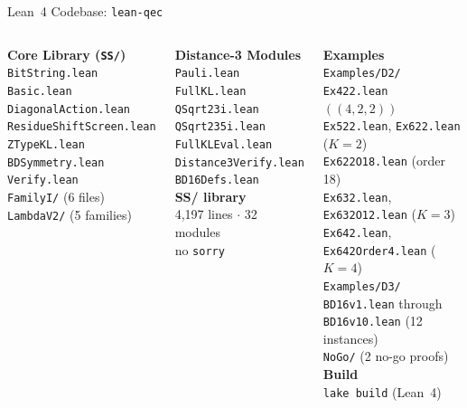 \documentclass[aspectratio=169,t,10pt]{beamer}
\newcommand{\code}[1]{\texttt{\small #1}}
\begin{document}
\begin{frame}{Lean~4 Codebase: \texttt{lean-qec}}

\begin{columns}[T]
{\small\textbf{Core Library (\code{SS/})}}\\
\code{BitString.lean}\\
\code{Basic.lean}\\
\code{DiagonalAction.lean}\\
\code{ResidueShiftScreen.lean}\\
\code{ZTypeKL.lean}\\
\code{BDSymmetry.lean}\\
\code{Verify.lean}\\
\code{FamilyI/} \textcolor{Slate}{\scriptsize(6 files)}\\
\code{LambdaV2/} \textcolor{Slate}{\scriptsize(5 families)}

{\small\textbf{Distance-3 Modules}}\\
\code{Pauli.lean}\\
\code{FullKL.lean}\\
\code{QSqrt23i.lean}\\
\code{QSqrt235i.lean}\\
\code{FullKLEval.lean}\\
\code{Distance3Verify.lean}\\
\code{BD16Defs.lean}\\[-0.4em]
{\small\textbf{SS/ library}}\\
4,197 lines $\cdot$ 32 modules\\
no \code{sorry}

{\small\textbf{Examples}}\\
\code{Examples/D2/}\\
\quad\code{Ex422.lean} \textcolor{Slate}{\scriptsize $((4,2,2))$}\\
\quad\code{Ex522.lean}, \code{Ex622.lean} \textcolor{Slate}{\scriptsize ($K{=}2$)}\\
\quad\code{Ex622O18.lean} \textcolor{Slate}{\scriptsize (order 18)}\\
\quad\code{Ex632.lean}, \code{Ex632O12.lean} \textcolor{Slate}{\scriptsize ($K{=}3$)}\\
\quad\code{Ex642.lean}, \code{Ex642Order4.lean} \textcolor{Slate}{\scriptsize ($K{=}4$)}\\
\code{Examples/D3/}\\
\quad\code{BD16v1.lean} \textcolor{Slate}{\scriptsize through}\\
\quad\code{BD16v10.lean} \textcolor{Slate}{\scriptsize (12 instances)}\\
\quad\code{NoGo/} \textcolor{Slate}{\scriptsize (2 no-go proofs)}\\
{\small\textbf{Build}}\\
\code{lake build} (Lean~4)
\vspace{-0.3em}
\end{columns}
\end{frame}
\end{document}
